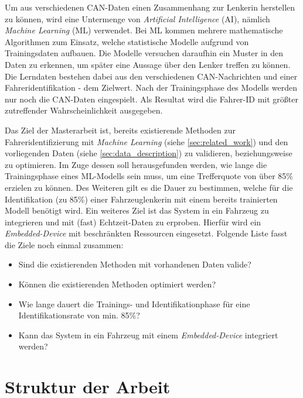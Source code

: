 Um aus verschiedenen CAN-Daten einen Zusammenhang zur Lenkerin herstellen zu können, wird eine Untermenge von \textit{Artificial Intelligence} (AI), nämlich \textit{Machine Learning} (ML) verwendet. Bei ML kommen mehrere mathematische Algorithmen zum Einsatz, welche statistische Modelle aufgrund von Trainingsdaten aufbauen. Die Modelle versuchen daraufhin ein Muster in den Daten zu erkennen, um später eine Aussage über den Lenker treffen zu können. Die Lerndaten bestehen dabei aus den verschiedenen CAN-Nachrichten und einer Fahreridentifikation - dem Zielwert. Nach der Trainingsphase des Modells werden nur noch die CAN-Daten eingespielt. Als Resultat wird die Fahrer-ID mit größter zutreffender Wahrscheinlichkeit ausgegeben.\cite{Conway2012}

Das Ziel der Masterarbeit ist, bereits existierende Methoden zur Fahreridentifizierung mit \textit{Machine Learning} (siehe \ref{sec:related_work}) und den vorliegenden Daten (siehe \ref{sec:data_description}) zu validieren, beziehungsweise zu optimieren. Im Zuge dessen soll herausgefunden werden, wie lange die Trainingsphase eines ML-Modells sein muss, um eine Trefferquote von über 85\% erzielen zu können. Des Weiteren gilt es die Dauer zu bestimmen, welche für die Identifikation (zu 85\%) einer Fahrzeuglenkerin mit einem bereits trainierten Modell benötigt wird. Ein weiteres Ziel ist das System in ein Fahrzeug zu integrieren und mit (fast) Echtzeit-Daten zu erproben. Hierfür wird ein \textit{Embedded-Device} mit beschränkten Ressourcen eingesetzt. Folgende Liste fasst die Ziele noch einmal zusammen:

\begin{itemize}
  \item Sind die existierenden Methoden mit vorhandenen Daten valide?
  \item Können die existierenden Methoden optimiert werden?
  \item Wie lange dauert die Trainings- und Identifikationphase für eine Identifikationsrate von min. 85\%?
  \item Kann das System in ein Fahrzeug mit einem \textit{Embedded-Device} integriert werden?
\end{itemize}

\section{Struktur der Arbeit}
\label{sec:structure}

